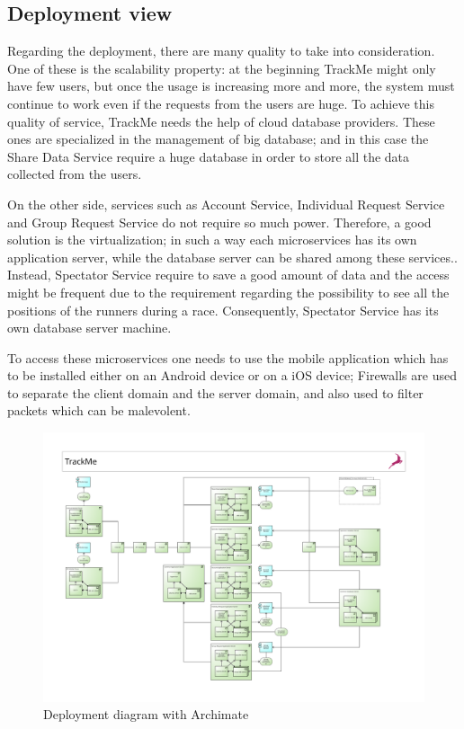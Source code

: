 \subsection{Deployment view}
\par
Regarding the deployment, there are many quality to take into consideration. One of these is the scalability property: at the beginning 
TrackMe might only have few users, but once the usage is increasing more and more, the system must continue to work even if the 
requests from the users are huge. To achieve this quality of service, TrackMe needs the help of cloud database providers. These ones 
are specialized in the management of big database; and in this case the Share Data Service require a huge database in order to store 
all the data collected from the users. 
\par
On the other side, services such as Account Service, Individual Request Service and Group Request Service do not require so much 
power. Therefore, a good solution is the virtualization; in such a way each microservices has its own application server, while 
the database server can be shared among these services.. Instead, Spectator Service require to save a good amount of data and 
the access might be frequent due to the requirement regarding the possibility to see all the positions of the runners during a race. 
Consequently, Spectator Service has its own database 
server machine.
\par
To access these microservices one needs to use the mobile application which has to be installed either on an Android device or on a iOS 
device; Firewalls are used to separate the client domain and the server domain, and also used to filter packets which can be malevolent.
\begin{figure}[H]
\includegraphics[width=\linewidth]{Images/deploymentdiagram.pdf}
\caption{ Deployment diagram with Archimate }
\label{fig:deployment}
\end{figure}
